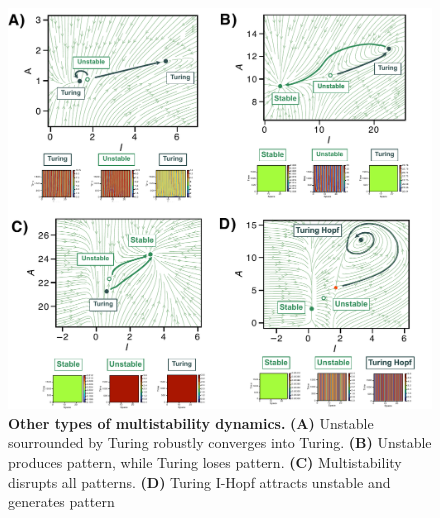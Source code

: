 \begin{figure}[H] %
    \centering
    \begin{adjustbox}{center}
    \includegraphics[width=1.2\textwidth]{chapters/Chapter 1/multistability_leftover} %
    \end{adjustbox}
    \caption{\textbf{Other types of multistability dynamics.} \textbf{(A)} Unstable sourrounded by Turing robustly converges into Turing. \textbf{(B)} Unstable produces pattern, while Turing loses pattern. \textbf{(C)} Multistability disrupts all patterns. \textbf{(D)} Turing I-Hopf attracts unstable and generates pattern}
    \label{fig:multistability_leftover} %
\end{figure}


